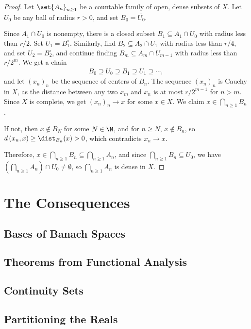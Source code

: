 \documentclass[10pt]{mypackage}
\begin{document}
\begin{proof}
  Let $\set{A_n}_{n\geq 1}$ be a countable family of open, dense subsets of $X$. Let $U_0$ be any ball of radius $r > 0$, and set $B_0 = \overline{U_0}$.\newline

  Since $A_1\cap U_0$ is nonempty, there is a closed subset $B_1\subseteq A_1\cap U_0$ with radius less than $r/2$. Set $U_1 = B_1^{\circ}$. Similarly, find $B_2\subseteq A_2\cap U_1$ with radius less than $r/4$, and set $U_2 = B_2^{\circ}$, and continue finding $B_m\subseteq A_m\cap U_{m-1}$ with radius less than $r/2^{m}$. We get a chain
  \begin{align*}
    B_0 \supseteq U_0\supseteq B_1\supseteq U_1\supseteq \cdots,
  \end{align*}
  and let $\left( x_n \right)_n$ be the sequence of centers of $B_n$. The sequence $\left( x_n \right)_n$ is Cauchy in $X$, as the distance between any two $x_m$ and $x_n$ is at most $r/2^{m-1}$ for $n > m$. Since $X$ is complete, we get $\left( x_n \right)_n\rightarrow x$ for some $x\in X$. We claim $x\in \bigcap_{n\geq 1}B_n$.\newline

  If not, then $x\notin B_{N}$ for some $N\in \N$, and for $n \geq N$, $x\notin B_n$, so $d\left( x_n,x \right) \geq \dist_{B_n}(x) > 0$, which contradicts $x_n\rightarrow x$.\newline

  Therefore, $x\in \bigcap_{n\geq 1}B_n\subseteq \bigcap_{n\geq 1}A_n$, and since $\bigcap_{n\geq 1}B_n\subseteq U_0$, we have $\left( \bigcap_{n\geq 1}A_n \right)\cap U_0 \neq \emptyset$, so $\bigcap_{n\geq 1}A_n$ is dense in $X$.
\end{proof}
\section{The Consequences}%
\subsection{Bases of Banach Spaces}%
\subsection{Theorems from Functional Analysis}%
\subsection{Continuity Sets}%
\subsection{Partitioning the Reals}%
\end{document}

